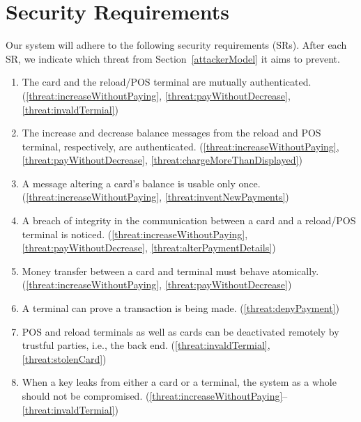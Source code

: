\documentclass{article}
\begin{document}
\section{Security Requirements}
Our system will adhere to the following security requirements (SRs). After each SR, we indicate which threat from Section~\ref{attackerModel} it aims to prevent.
\begin{enumerate}[label={SR\arabic*:}, ref={SR\arabic*}, leftmargin=3\parindent]
    \item \label{sr:mutualAuth}
    The card and the reload/POS terminal are mutually authenticated. (\ref{threat:increaseWithoutPaying}, \ref{threat:payWithoutDecrease}, \ref{threat:invaldTermial})
    
    \item \label{sr:messageAuth}
    The increase and decrease balance messages from the reload and POS terminal, respectively, are authenticated. (\ref{threat:increaseWithoutPaying}, \ref{threat:payWithoutDecrease}, \ref{threat:chargeMoreThanDisplayed})
    
    \item \label{sr:replayProtection}
    A message altering a card's balance is usable only once. (\ref{threat:increaseWithoutPaying}, \ref{threat:inventNewPayments})
    
    \item \label{sr:messageIntegrity}
    A breach of integrity in the communication between a card and a reload/POS terminal is noticed. (\ref{threat:increaseWithoutPaying}, \ref{threat:payWithoutDecrease}, \ref{threat:alterPaymentDetails})
    
    \item \label{sr:atomic}
    Money transfer between a card and terminal must behave atomically. (\ref{threat:increaseWithoutPaying}, \ref{threat:payWithoutDecrease})

    \item \label{sr:nonRepudiation}
    A terminal can prove a transaction is being made. (\ref{threat:denyPayment})

    \item \label{sr:block}
    POS and reload terminals as well as cards can be deactivated remotely by trustful parties, i.e., the back end. (\ref{threat:invaldTermial}, \ref{threat:stolenCard})

    \item \label{sr:keyLeakage}
    When a key leaks from either a card or a terminal, the system as a whole should not be compromised. (\ref{threat:increaseWithoutPaying}--\ref{threat:invaldTermial})
\end{enumerate}
\end{document}
